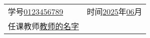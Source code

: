 \begin{titlepage}
\begin{center}
\begin{tabular}{p{15em}p{12em}}
            学号\underline{\hspace{3.5em}0123456789\hspace{3.5em}} & 时间\underline{\hspace{1em}2025\hspace{1em}}年\underline{\hspace{1em}06\hspace{1em}}月 \\
            任课教师\underline{\hspace{2.5em}教师的名字\hspace{2.5em}} & \\


        \end{tabular}
    \end{center}

    \vspace*{\fill} %
\end{titlepage}
